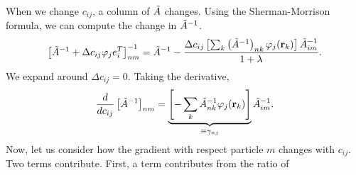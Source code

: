 \documentclass[letterpaper]{article}
\begin{document}
\newpage
When we change $c_{ij}$, a column of $\tilde{A}$ changes.  Using the Sherman-Morrison formula, we can compute the change in $\tilde{A}^{-1}$.
\begin{equation}
\left[\tilde{A}^{-1} + \Delta c_{ij} \varphi_j e_i^T\right]^{-1}_{nm} =
\tilde{A}^{-1} - \frac{\Delta c_{ij} \left[\sum_k \left(\tilde{A}^{-1}\right)_{nk} \varphi_j(\mathbf{r}_k)\right]\tilde{A}^{-1}_{im}}{1 + \lambda}.
\end{equation}
We expand around $\Delta c_{ij}=0$.  Taking the derivative,
\begin{equation}
\frac{d}{dc_{ij}} \left[\tilde{A}^{-1}\right]_{nm} = \underbrace{\left[-\sum_k \tilde{A}^{-1}_{nk} \varphi_j(\mathbf{r}_k)\right]}_{\equiv \gamma_{nj}}\tilde{A}^{-1}_{im}.
\end{equation}
Now, let us consider how the gradient with respect particle $m$ changes with
$c_{ij}$.  Two terms contribute.  First, a term contributes from the
ratio of 
\end{document}
